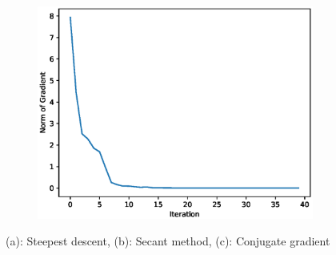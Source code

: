 \begin{figure}[h!]
\begin{subfigure}[t]{0.6\textwidth}
    \includegraphics[width=\textwidth]{images/python/cg-pA.eps}
    \caption{}
\end{subfigure}
\caption{(a): Steepest descent, (b): Secant method, (c): Conjugate gradient}
\end{figure}
\clearpage

\clearpage

